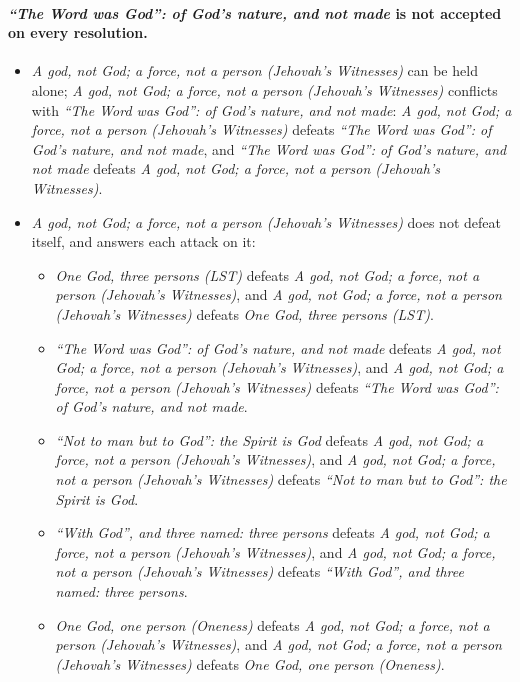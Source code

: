 \documentclass[11pt,paper=\testimonypaper,DIV=13,parskip=false]{scrartcl}
\begin{document}
\paragraph{\emph{“The Word was God”: of God’s nature, and not made} is not accepted on every resolution.}
\begin{itemize}
\item \emph{A god, not God; a force, not a person (Jehovah’s Witnesses)} can be held alone; \emph{A god, not God; a force, not a person (Jehovah’s Witnesses)} conflicts with \emph{“The Word was God”: of God’s nature, and not made}: \emph{A god, not God; a force, not a person (Jehovah’s Witnesses)} defeats \emph{“The Word was God”: of God’s nature, and not made}, and \emph{“The Word was God”: of God’s nature, and not made} defeats \emph{A god, not God; a force, not a person (Jehovah’s Witnesses)}.
\item \emph{A god, not God; a force, not a person (Jehovah’s Witnesses)} does not defeat itself, and answers each attack on it:
\begin{itemize}
\item \emph{One God, three persons (LST)} defeats \emph{A god, not God; a force, not a person (Jehovah’s Witnesses)}, and \emph{A god, not God; a force, not a person (Jehovah’s Witnesses)} defeats \emph{One God, three persons (LST)}.
\item \emph{“The Word was God”: of God’s nature, and not made} defeats \emph{A god, not God; a force, not a person (Jehovah’s Witnesses)}, and \emph{A god, not God; a force, not a person (Jehovah’s Witnesses)} defeats \emph{“The Word was God”: of God’s nature, and not made}.
\item \emph{“Not to man but to God”: the Spirit is God} defeats \emph{A god, not God; a force, not a person (Jehovah’s Witnesses)}, and \emph{A god, not God; a force, not a person (Jehovah’s Witnesses)} defeats \emph{“Not to man but to God”: the Spirit is God}.
\item \emph{“With God”, and three named: three persons} defeats \emph{A god, not God; a force, not a person (Jehovah’s Witnesses)}, and \emph{A god, not God; a force, not a person (Jehovah’s Witnesses)} defeats \emph{“With God”, and three named: three persons}.
\item \emph{One God, one person (Oneness)} defeats \emph{A god, not God; a force, not a person (Jehovah’s Witnesses)}, and \emph{A god, not God; a force, not a person (Jehovah’s Witnesses)} defeats \emph{One God, one person (Oneness)}.
\end{itemize}
\end{itemize}
\end{document}
